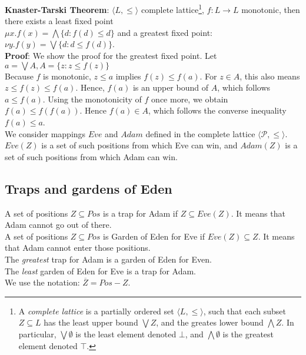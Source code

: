 \noindent
\textbf{Knaster-Tarski Theorem}: $\langle L, \le \rangle$ complete lattice\footnote{
	A \textit{complete lattice} is a partially ordered set $\langle L, \leq \rangle$, such that
	each subset $Z \subseteq L$ has the least upper bound $\bigvee Z$, and the greates lower
	bound $\bigwedge Z$. In particular, $\bigvee \emptyset$ is the least element denoted $\bot$,
	and $\bigwedge \emptyset$ is the greatest element denoted $\top$.
}, $f : L \rightarrow L$ monotonic,
then there exists a least fixed point\\
$\mu x. f(x) = \bigwedge \{d : f(d) \leq d\}$ and a greatest fixed point:\\
$\nu y. f(y) = \bigvee \{d : d \leq f(d) \}$.\\
\textbf{Proof}: We show the proof for the greatest fixed point. Let $a = \bigvee A, A = \{z : z \leq f(z)\}$\\
Because $f$ is monotonic, $z \leq a$ implies $f(z) \leq f(a)$. For $z \in A$, this also means $z \leq f(z) \leq f(a)$.
Hence, $f(a)$ is an upper bound of $A$, which follows $a \leq f(a)$. Using the monotonicity of $f$ once more, we obtain
$f(a) \leq f(f(a))$. Hence $f(a) \in A$, which follows the converse inequality $f(a) \leq a$.\\

\noindent
We consider mappings $Eve$ and $Adam$ defined in the complete lattice $\langle \mathcal{P}, \leq \rangle$.
$Eve(Z)$ is a set of such positions from which Eve can win, and $Adam(Z)$ is a set of such positions from which Adam can win.

\subsection*{Traps and gardens of Eden}
\noindent
A set of positions $Z \subseteq Pos$ is a trap for Adam if $Z \subseteq Eve(Z)$. It means that Adam cannot go out of there.\\
A set of positions $Z \subseteq Pos$ is Garden of Eden for Eve if $Eve(Z) \subseteq Z$. It means that Adam cannot enter those positions.\\

\noindent
The \textit{greatest} trap for Adam is a garden of Eden for Even.\\
The \textit{least} garden of Eden for Eve is a trap for Adam.\\

We use the notation: $\overline{Z} = Pos - Z$.

